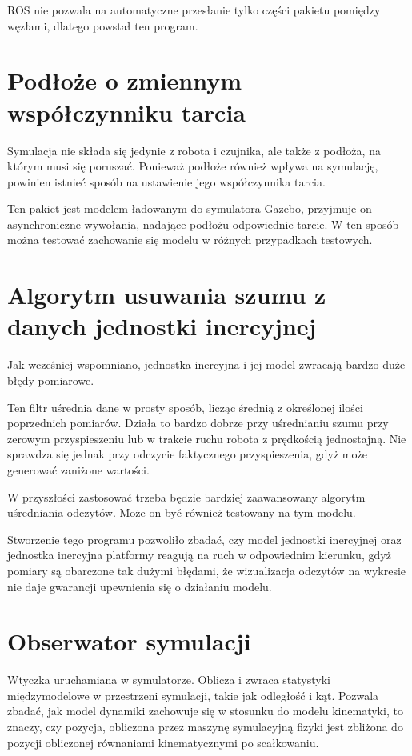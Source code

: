 	ROS nie pozwala na automatyczne przesłanie tylko części pakietu pomiędzy węzłami, dlatego powstał ten program.

\section{Podłoże o zmiennym współczynniku tarcia}
	\label{sec:flooria}
	Symulacja nie składa się jedynie z robota i czujnika, ale także z podłoża, na którym musi się poruszać.
	Ponieważ podłoże również wpływa na symulację, powinien istnieć sposób na ustawienie jego współczynnika tarcia.
	
	Ten pakiet jest modelem ładowanym do symulatora Gazebo, przyjmuje on asynchroniczne wywołania, nadające podłożu odpowiednie tarcie.
	W ten sposób można testować zachowanie się modelu w różnych przypadkach testowych.
	
\section{Algorytm usuwania szumu z danych jednostki inercyjnej}
	\label{sec:odszumiacz}
	Jak wcześniej wspomniano, jednostka inercyjna i jej model zwracają bardzo duże błędy pomiarowe.
	
	Ten filtr uśrednia dane w prosty sposób, licząc średnią z określonej ilości poprzednich pomiarów.
	Działa to bardzo dobrze przy uśrednianiu szumu przy zerowym przyspieszeniu lub w trakcie ruchu robota z prędkością jednostajną.
	Nie sprawdza się jednak przy odczycie faktycznego przyspieszenia, gdyż może generować zaniżone wartości.
	
	W przyszłości zastosować trzeba będzie bardziej zaawansowany algorytm uśredniania odczytów.
	Może on być również testowany na tym modelu.
	
	Stworzenie tego programu pozwoliło zbadać, czy model jednostki inercyjnej oraz jednostka inercyjna platformy reagują na ruch w odpowiednim kierunku, gdyż
	pomiary są obarczone tak dużymi błędami, że wizualizacja odczytów na wykresie nie daje gwarancji upewnienia się o działaniu modelu.
	
\section{Obserwator symulacji}
	\label{sec:ocznica}
	Wtyczka uruchamiana w symulatorze.
	Oblicza i zwraca statystyki międzymodelowe w przestrzeni symulacji, takie jak odległość i kąt.
	Pozwala zbadać, jak model dynamiki zachowuje się w stosunku do modelu kinematyki, to znaczy, 
	czy pozycja, obliczona przez maszynę symulacyjną fizyki jest zbliżona do pozycji obliczonej równaniami kinematycznymi po scałkowaniu.
	
